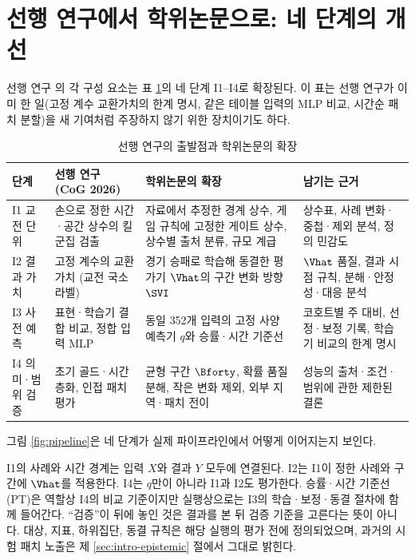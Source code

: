 \section{선행 연구에서 학위논문으로: 네 단계의 개선}
\label{sec:intro-improvement}

선행 연구 \cite{baek2026killconditioned}의 각 구성 요소는 표 \ref{tab:cog-to-thesis}의 네 단계 I1--I4로 확장된다. 이 표는 선행 연구가 이미 한 일(고정 계수 교환가치의 한계 명시, 같은 테이블 입력의 MLP 비교, 시간순 패치 분할)을 새 기여처럼 주장하지 않기 위한 장치이기도 하다.

\begin{table}[htbp]
  \centering
  \caption{선행 연구의 출발점과 학위논문의 확장}
  \label{tab:cog-to-thesis}
  \small
  \begin{tabularx}{\linewidth}{@{}l>{\raggedright\arraybackslash}p{4.3cm}>{\raggedright\arraybackslash}p{4.3cm}X@{}}
    \toprule
    단계 & 선행 연구 (CoG 2026) & 학위논문의 확장 & 남기는 근거 \\
    \midrule
    I1 교전 단위 & 손으로 정한 시간·공간 상수의 킬 군집 검출 & 자료에서 추정한 경계 상수, 게임 규칙에 고정한 게이트 상수, 상수별 출처 분류, 규모 계급 & 상수표, 사례 변화·중첩·제외 분석, 정의 민감도 \\
    I2 결과 가치 & 고정 계수의 교환가치 (교전 국소 라벨) & 경기 승패로 학습해 동결한 평가기 $\Vhat$의 구간 변화 방향 $\SVI$ & $\Vhat$ 품질, 결과 시점 규칙, 분해·안정성·대응 분석 \\
    I3 사전 예측 & 표현·학습기 결합 비교, 정합 입력 MLP & 동일 352개 입력의 고정 사양 예측기 $q$와 승률·시간 기준선 & 코호트별 주 대비, 선정·보정 기록, 학습기 비교의 한계 명시 \\
    I4 의미·범위 검증 & 초기 골드·시간 층화, 인접 패치 평가 & 균형 구간 $\Bforty$, 확률 품질 분해, 작은 변화 제외, 외부 지역·패치 전이 & 성능의 출처·조건·범위에 관한 제한된 결론 \\
    \bottomrule
  \end{tabularx}
\end{table}

그림 \ref{fig:pipeline}은 네 단계가 실제 파이프라인에서 어떻게 이어지는지 보인다.



I1의 사례와 시간 경계는 입력 $X$와 결과 $Y$ 모두에 연결된다. I2는 I1이 정한 사례와 구간에 $\Vhat$를 적용한다. I4는 $q$만이 아니라 I1과 I2도 평가한다. 승률·시간 기준선(PT)은 역할상 I4의 비교 기준이지만 실행상으로는 I3의 학습·보정·동결 절차에 함께 들어간다. ``검증''이 뒤에 놓인 것은 결과를 본 뒤 검증 기준을 고른다는 뜻이 아니다. 대상, 지표, 하위집단, 동결 규칙은 해당 실행의 평가 전에 정의되었으며, 과거의 시험 패치 노출은 제 \ref{sec:intro-epistemic} 절에서 그대로 밝힌다.

